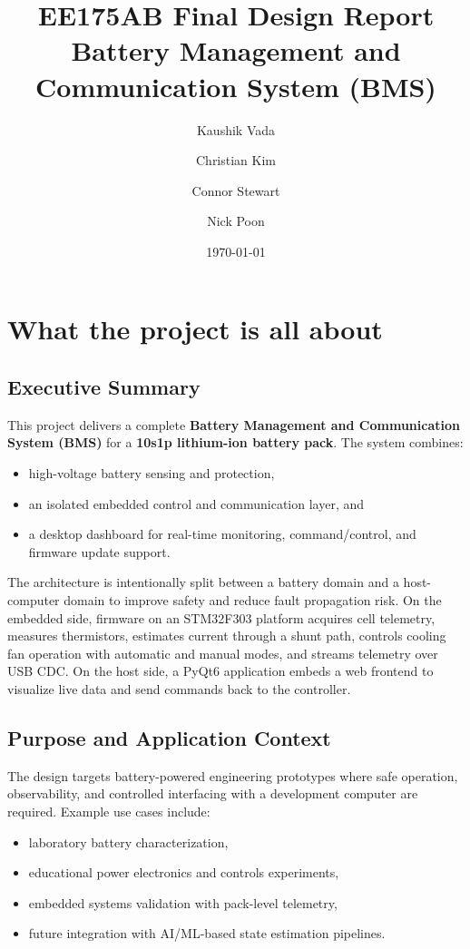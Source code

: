 \documentclass[12pt]{article}
\title{EE175AB Final Design Report\\Battery Management and Communication System (BMS)}
\author{Kaushik Vada \and Christian Kim \and Connor Stewart \and Nick Poon}
\date{\today}
\begin{document}
\maketitle
\tableofcontents
\newpage

\section{What the project is all about}

\subsection{Executive Summary}
This project delivers a complete \textbf{Battery Management and Communication System (BMS)} for a \textbf{10s1p lithium-ion battery pack}. The system combines:
\begin{itemize}[leftmargin=1.2cm]
    \item high-voltage battery sensing and protection,
    \item an isolated embedded control and communication layer, and
    \item a desktop dashboard for real-time monitoring, command/control, and firmware update support.
\end{itemize}

The architecture is intentionally split between a battery domain and a host-computer domain to improve safety and reduce fault propagation risk. On the embedded side, firmware on an STM32F303 platform acquires cell telemetry, measures thermistors, estimates current through a shunt path, controls cooling fan operation with automatic and manual modes, and streams telemetry over USB CDC. On the host side, a PyQt6 application embeds a web frontend to visualize live data and send commands back to the controller.

\subsection{Purpose and Application Context}
The design targets battery-powered engineering prototypes where safe operation, observability, and controlled interfacing with a development computer are required. Example use cases include:
\begin{itemize}[leftmargin=1.2cm]
    \item laboratory battery characterization,
    \item educational power electronics and controls experiments,
    \item embedded systems validation with pack-level telemetry,
    \item future integration with AI/ML-based state estimation pipelines.
\end{itemize}
\end{document}
